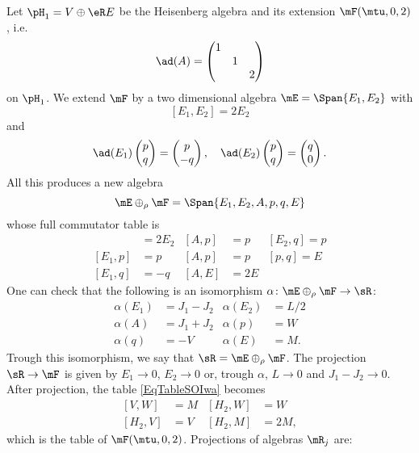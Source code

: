 Let $\pH_{1}=V\oplus\eR E$ be the Heisenberg algebra and its extension $\mF(\mtu,0,2)$, i.e.
\[
	\ad(A)=\begin{pmatrix}
		1 \\&1\\&&2
	\end{pmatrix}
\]
on $\pH_{1}$. We extend $\mF$ by a two dimensional algebra $\mE=\Span\{ E_{1},E_{2} \}$ with
\[
	[E_{1},E_{2}]=2E_{2}
\]
and
\begin{equation}
	\ad(E_{1})\begin{pmatrix}
		p \\q
	\end{pmatrix}=\begin{pmatrix}
		p \\-q
	\end{pmatrix},
	\quad
	\ad(E_{2})\begin{pmatrix}
		p \\q
	\end{pmatrix}
	=\begin{pmatrix}
		q \\0
	\end{pmatrix}.
\end{equation}
All this produces a new algebra
\[
	\mE\oplus_{\rho}\mF=\Span\{ E_{1},E_{2},A,p,q,E \}
\]
whose full commutator table is
\begin{align*}
	[E_{1},E_{2}] & =2E_{2} & [A,p] & =p  & [E_{2},q]=p \\
	[E_{1},p]     & =p      & [A,p] & =p  & [p,q]=E     \\
	[E_{1},q]     & =-q     & [A,E] & =2E
\end{align*}
One can check that the following is an isomorphism $\alpha\colon \mE\oplus_{\rho}\mF\to \sR$:
\begin{subequations}\label{EqDefalphaisomRF}
	\begin{align}
		\alpha(E_{1}) & =J_{1}-J_{2} & \alpha(E_{2}) & =L/2 \\
		\alpha(A)     & =J_{1}+J_{2} & \alpha(p)     & =W   \\
		\alpha(q)     & =-V          & \alpha(E)     & =M.
	\end{align}
\end{subequations}
Trough this isomorphism, we say that $\sR=\mE\oplus_{\rho}\mF$. The projection $\sR\to\mF$ is given by $E_{1}\to 0$, $E_{2}\to 0$ or, trough $\alpha$, $L\to 0$ and $J_{1}-J_{2}\to 0$. After projection, the table \eqref{EqTableSOIwa} becomes
\begin{subequations}
	\begin{align}
		[V,W]     & =M
		          & [H_{2},W] & =W   \\
		[H_{2},V] & =V
		          & [H_{2},M] & =2M,
	\end{align}
\end{subequations}
which is the table of $\mF(\mtu,0,2)$. Projections of algebras $\mR_{j}$ are:

